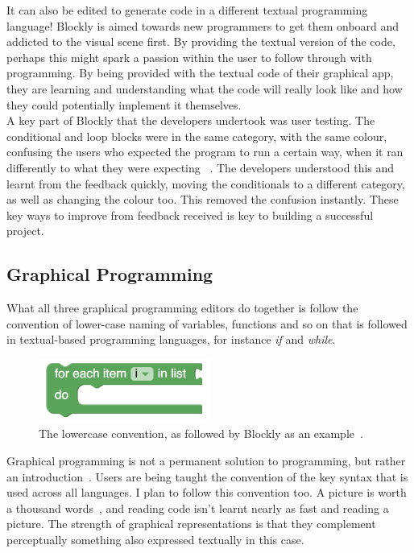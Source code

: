 \documentclass[a4paper, 12pt]{article}
\begin{document}
            It can also be edited to generate code in a different textual programming language!
            Blockly is aimed towards new programmers to get them onboard and addicted to the visual 
            scene first. By providing the textual version of the code, perhaps this might spark a 
            passion within the user to follow through with programming. By being provided with the 
            textual code of their graphical app, they are learning and understanding what the code 
            will really look like and how they could potentially implement it themselves. \\

            A key part of Blockly that the developers undertook was user testing. The conditional and loop blocks were in the same category, with the same colour, 
            confusing the users who expected the program to run a certain way, when it ran differently 
            to what they were expecting ~\cite{fraser2015ten}. The developers understood this and 
            learnt from the feedback quickly, moving the conditionals to a different category, as 
            well as changing the colour too. This removed the confusion instantly. These key ways to improve 
            from feedback received is key to building a successful project.
        
        \clearpage
        \subsection{Graphical Programming}
            What all three graphical programming editors do together is follow the convention 
            of lower-case naming of variables, functions and so on that is followed in textual-based
            programming languages, for instance \textit{if} and \textit{while}. 

            \begin{figure}[h]
                \centering
                \includegraphics{lowercase_convention.png}
                \caption{The lowercase convention, as followed by Blockly as an example~\cite{pasternak2017tips}.}
            \end{figure}

            Graphical programming is not a permanent solution to programming, but rather an 
            introduction~\cite{gregoryvisual}. Users are being taught the convention of the key
            syntax that is used across all languages. I plan to follow this convention too. A
            picture is worth a thousand words~\cite{petre1995looking}, and reading code isn't learnt
            nearly as fast and reading a picture. The strength of graphical representations is
            that they complement perceptually something also expressed textually in this case.
\end{document}

